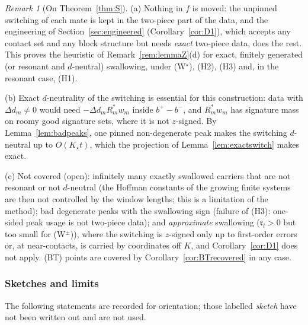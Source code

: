 \documentclass[10pt]{amsart}
\theoremstyle{definition}
\theoremstyle{remark}
\newtheorem{remark}[theorem]{Remark}
\begin{document}
\begin{remark}[On Theorem~\ref{thm:S}]\label{rem:S}
(a) Nothing in $f$ is moved: the unpinned switching of each mate is kept in
the two-piece part of the data, and the engineering of
Section~\ref{sec:engineered} (Corollary~\ref{cor:D1}), which accepts any
contact set and any block structure but needs \emph{exact} two-piece data,
does the rest.  This proves the heuristic of Remark~\ref{rem:lemmaZ}(d)
for exact, finitely generated (or resonant and $d$-neutral) swallowing,
under \textup{(W$^\star$)}, \textup{(H2)}, \textup{(H3)} and, in the
resonant case, \textup{(H1)}.

(b) Exact $d$-neutrality of the switching is essential for this
construction: data with $\Delta d_m\neq0$ would need $-\Delta d_mR_m^*w_m$
inside $b^+-b^-$, and $R_m^*w_m$ has signature mass on roomy good signature
sets, where it is not $z$-signed.  By Lemma~\ref{lem:badpeaks}, one pinned
non-degenerate peak makes the switching $d$-neutral up to $O(K_\star t)$,
which the projection of Lemma~\ref{lem:exactswitch} makes exact.

(c) Not covered (open): infinitely many exactly swallowed carriers that are
not resonant or not $d$-neutral (the Hoffman constants of the growing
finite systems are then not controlled by the window lengths; this is a
limitation of the method); bad degenerate peaks with the swallowing sign
(failure of (H3): one-sided peak usage is not two-piece data); and
\emph{approximate} swallowing ($\mathfrak r_l>0$ but too small for
(W$^\pm$)), where the switching is $z$-signed only up to first-order errors
or, at near-contacts, is carried by coordinates off $K$, and
Corollary~\ref{cor:D1} does not apply.  \textup{(BT)} points are
covered by Corollary~\ref{cor:BTrecovered} in any case.
\end{remark}

\subsubsection*{Sketches and limits}
The following statements are recorded for orientation; those labelled
\emph{sketch} have not been written out and are not used.
\end{document}
